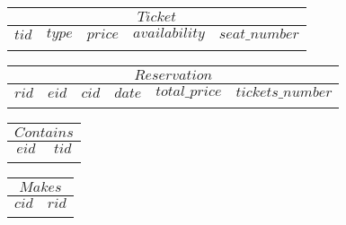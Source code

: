 \documentclass{article}
\begin{document}
\vspace{10pt}

\noindent
\begin{tabular}{|c|c|c|c|c|}
\hline
\multicolumn{5}{|c|}{$Ticket$} \\
\hline
$tid$ & $type$ & $price$ & $availability$ & $seat\_number$ \\
\hline
& & & & \\
\hline
\end{tabular}

\vspace{10pt}

\noindent
\begin{tabular}{|c|c|c|c|c|c|}
\hline
\multicolumn{6}{|c|}{$Reservation$} \\
\hline
$rid$ & $eid$ & $cid$ & $date$ & $total\_price$ & $tickets\_number$ \\
\hline
& & & & & \\
\hline
\end{tabular}

\vspace{10pt}


\noindent
\begin{tabular}{|c|c|}
\hline
\multicolumn{2}{|c|}{$Contains$} \\
\hline
$eid$ & $tid$ \\
\hline
& \\
\hline
\end{tabular}

\vspace{5pt}

\noindent
\begin{tabular}{|c|c|}
\hline
\multicolumn{2}{|c|}{$Makes$} \\
\hline
$cid$ & $rid$ \\
\hline
& \\
\hline
\end{tabular}
\end{document}
